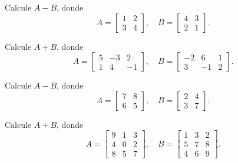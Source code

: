 \begin{ejercicio}
Calcule $A-B$, donde
\[
A=\begin{bmatrix} 1 & 2 \\ 3 & 4 \end{bmatrix}, \quad
B=\begin{bmatrix} 4 & 3 \\ 2 & 1 \end{bmatrix}.
\]
\end{ejercicio}
\muestraSolucion{
\[
A-B=\begin{bmatrix} -3 & -1 \\ 1 & 3 \end{bmatrix}.
\]
}

\begin{ejercicio}
Calcule $A+B$, donde
\[
A=\begin{bmatrix} 5 & -3 & 2 \\ 1 & 4 & -1 \end{bmatrix}, \quad
B=\begin{bmatrix} -2 & 6 & 1 \\ 3 & -1 & 2 \end{bmatrix}.
\]
\end{ejercicio}
\muestraSolucion{
\[
A+B=\begin{bmatrix} 3 & 3 & 3 \\ 4 & 3 & 1 \end{bmatrix}.
\]
}

\begin{ejercicio}
Calcule $A-B$, donde
\[
A=\begin{bmatrix} 7 & 8 \\ 6 & 5 \end{bmatrix}, \quad
B=\begin{bmatrix} 2 & 4 \\ 3 & 7 \end{bmatrix}.
\]
\end{ejercicio}
\muestraSolucion{
\[
A-B=\begin{bmatrix} 5 & 4 \\ 3 & -2 \end{bmatrix}.
\]
}

\begin{ejercicio}
Calcule $A+B$, donde
\[
A=\begin{bmatrix} 9 & 1 & 3 \\ 4 & 0 & 2 \\ 8 & 5 & 7 \end{bmatrix}, \quad
B=\begin{bmatrix} 1 & 3 & 2 \\ 5 & 7 & 8 \\ 4 & 6 & 9 \end{bmatrix}.
\]
\end{ejercicio}
\muestraSolucion{
\[
A+B=\begin{bmatrix} 10 & 4 & 5 \\ 9 & 7 & 10 \\ 12 & 11 & 16 \end{bmatrix}.
\]
}

